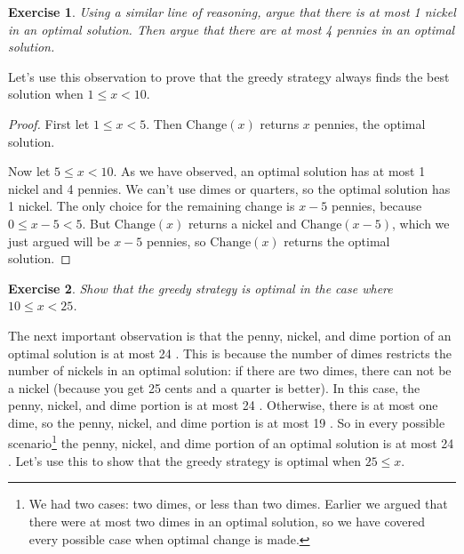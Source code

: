 \documentclass[paper=a4, fontsize=11pt]{scrartcl} %
\numberwithin{equation}{section} %
\numberwithin{figure}{section} %
\numberwithin{table}{section} %
\newtheorem{exercise}{Exercise} %
\begin{document}
\begin{exercise}
Using a similar line of reasoning, argue that there is at most 1 nickel in an optimal solution. Then argue that there are at most 4 pennies in an optimal solution.
\end{exercise}

Let's use this observation to prove that the greedy strategy always finds the best solution when $1 \leq x < 10$.
\begin{proof}
First let $1 \leq x < 5$.
Then $\mathrm{Change}(x)$ returns $x$ pennies, the optimal solution.

Now let $5 \leq x < 10$.
As we have observed, an optimal solution has at most 1 nickel and 4 pennies.
We can't use dimes or quarters, so the optimal solution has 1 nickel.
The only choice for the remaining change is $x - 5$ pennies, because $0 \leq x - 5 < 5$.
But $\mathrm{Change}(x)$ returns a nickel and $\mathrm{Change}(x-5)$, which we just argued will be $x-5$ pennies, so $\mathrm{Change}(x)$ returns the optimal solution.
\end{proof}

\begin{exercise}
Show that the greedy strategy is optimal in the case where $10 \leq x < 25$.
\end{exercise}

The next important observation is that the penny, nickel, and dime portion of an optimal solution is at most 24 \cent.
This is because the number of dimes restricts the number of nickels in an optimal solution: if there are two dimes, there can not be a nickel (because you get 25 cents and a quarter is better).
In this case, the penny, nickel, and dime portion is at most 24 \cent.
Otherwise, there is at most one dime, so the penny, nickel, and dime portion is at most 19 \cent.
So in every possible scenario\footnote{We had two cases: two dimes, or less than two dimes. Earlier we argued that there were at most two dimes in an optimal solution, so we have covered every possible case when optimal change is made.} the penny, nickel, and dime portion of an optimal solution is at most 24 \cent.
Let's use this to show that the greedy strategy is optimal when $25 \leq x$.
\end{document}
